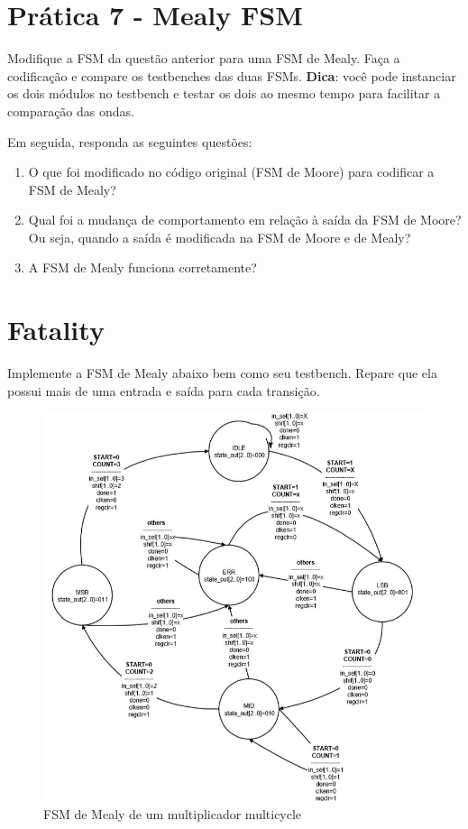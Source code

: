 \documentclass[a4paper]{article}
\begin{document}

\section*{Prática 7 - Mealy FSM}

Modifique a FSM da questão anterior para uma FSM de Mealy. Faça a codificação e compare os testbenches das duas FSMs. \textbf{Dica}: você pode instanciar os dois módulos no testbench e testar os dois ao mesmo tempo para facilitar a comparação das ondas.

Em seguida, responda as seguintes questões:

\begin{enumerate}
\item O que foi modificado no código original (FSM de Moore) para codificar a FSM de Mealy?

\item Qual foi a mudança de comportamento em relação à saída da FSM de Moore? Ou seja, quando a saída é modificada na FSM de Moore e de Mealy?

\item A FSM de Mealy funciona corretamente?

\end{enumerate}

\newpage
\section*{Fatality}
Implemente a FSM de Mealy abaixo bem como seu testbench. Repare que ela possui mais de uma entrada e saída para cada transição.

\begin{figure}[H]
	\centering
    \includegraphics[width=.8\linewidth]{images/multicycle_multiplier.jpg}
    \caption*{FSM de Mealy de um multiplicador multicycle}
\end{figure}
\end{document}
